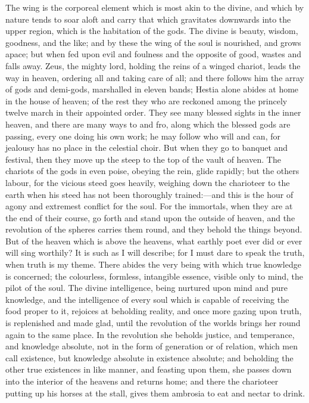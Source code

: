 \documentclass[11pt,letter]{article}
\begin{document}
\par  The wing is the corporeal element which is most akin to the divine, and which by nature tends to soar aloft and carry that which gravitates downwards into the upper region, which is the habitation of the gods. The divine is beauty, wisdom, goodness, and the like; and by these the wing of the soul is nourished, and grows apace; but when fed upon evil and foulness and the opposite of good, wastes and falls away. Zeus, the mighty lord, holding the reins of a winged chariot, leads the way in heaven, ordering all and taking care of all; and there follows him the array of gods and demi-gods, marshalled in eleven bands; Hestia alone abides at home in the house of heaven; of the rest they who are reckoned among the princely twelve march in their appointed order. They see many blessed sights in the inner heaven, and there are many ways to and fro, along which the blessed gods are passing, every one doing his own work; he may follow who will and can, for jealousy has no place in the celestial choir. But when they go to banquet and festival, then they move up the steep to the top of the vault of heaven. The chariots of the gods in even poise, obeying the rein, glide rapidly; but the others labour, for the vicious steed goes heavily, weighing down the charioteer to the earth when his steed has not been thoroughly trained:—and this is the hour of agony and extremest conflict for the soul. For the immortals, when they are at the end of their course, go forth and stand upon the outside of heaven, and the revolution of the spheres carries them round, and they behold the things beyond. But of the heaven which is above the heavens, what earthly poet ever did or ever will sing worthily? It is such as I will describe; for I must dare to speak the truth, when truth is my theme. There abides the very being with which true knowledge is concerned; the colourless, formless, intangible essence, visible only to mind, the pilot of the soul. The divine intelligence, being nurtured upon mind and pure knowledge, and the intelligence of every soul which is capable of receiving the food proper to it, rejoices at beholding reality, and once more gazing upon truth, is replenished and made glad, until the revolution of the worlds brings her round again to the same place. In the revolution she beholds justice, and temperance, and knowledge absolute, not in the form of generation or of relation, which men call existence, but knowledge absolute in existence absolute; and beholding the other true existences in like manner, and feasting upon them, she passes down into the interior of the heavens and returns home; and there the charioteer putting up his horses at the stall, gives them ambrosia to eat and nectar to drink.
\end{document}
